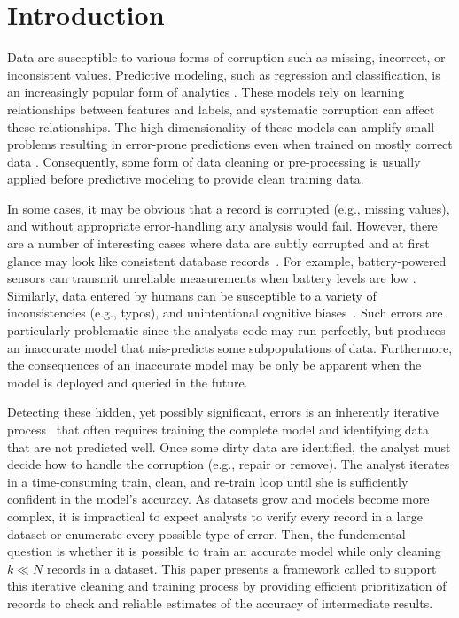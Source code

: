 \section{Introduction}
Data are susceptible to various forms of corruption such as missing, incorrect, or inconsistent values.
Predictive modeling, such as regression and classification, is an increasingly popular form of analytics \cite{bdas, alexandrov2014stratosphere, crotty2014tupleware, hellerstein2012madlib}.
These models rely on learning relationships between features and labels, and systematic corruption \cite{taylor1982introduction} can affect these relationships.
The high dimensionality of these models can amplify small problems resulting in error-prone predictions even when trained on mostly correct data \cite{xiaofeature}.
Consequently, some form of data cleaning or pre-processing is usually applied before predictive modeling to provide clean training data.

In some cases, it may be obvious that a record is corrupted (e.g., missing values), and without appropriate error-handling any analysis would fail.
However, there are a number of interesting cases where data are subtly corrupted and at first glance may look like consistent database records~\cite{rahm2000data}.
For example, battery-powered sensors can transmit unreliable measurements when battery levels are low \cite{DBLP:conf/pervasive/JefferyAFHW06}. 
Similarly, data entered by humans can be susceptible to a variety of inconsistencies (e.g., typos), and unintentional cognitive biases~\cite{DBLP:conf/recsys/KrishnanPFG14}.
Such errors are particularly problematic since the analysts code may run perfectly, but produces an inaccurate model that mis-predicts some subpopulations of data.
Furthermore, the consequences of an inaccurate model may be only be apparent when the model is deployed and queried in the future. 

Detecting these hidden, yet possibly significant, errors is an inherently iterative process~\cite{dasu2003exploratory} that often requires training the complete model and identifying data that are not predicted well.
Once some dirty data are identified, the analyst must decide how to handle the corruption (e.g., repair or remove). 
The analyst iterates in a time-consuming train, clean, and re-train loop until she is sufficiently confident in the model's accuracy.
As datasets grow and models become more complex, it is impractical to expect analysts to verify every record in a large dataset or enumerate every possible type of error.
Then, the fundemental question is whether it is possible to train an accurate model while only cleaning $k \ll N$ records in a dataset. 
This paper presents a framework called \sys to support this iterative cleaning and training process by providing efficient prioritization of records to check and reliable estimates of the accuracy of intermediate results.

